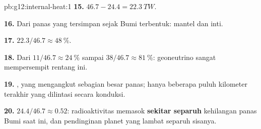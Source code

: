 \begin{solution}{pb:g12:internal-heat:1}
\textbf{15.} $46.7 - 24.4 = \qty{22.3}{TW}$.

\textbf{16.} Dari panas yang tersimpan sejak Bumi terbentuk: 
mantel dan inti.

\textbf{17.} $22.3/46.7 \approx \qty{48}{\percent}$.

\textbf{18.} Dari $11/46.7 \approx \qty{24}{\percent}$ sampai $38/46.7 \approx
\qty{81}{\percent}$: geoneutrino sangat mempersempit rentang ini.

\textbf{19.} , yang mengangkut sebagian besar panas; hanya
beberapa puluh kilometer terakhir yang dilintasi secara konduksi.

\textbf{20.} $24.4/46.7 \approx 0.52$: radioaktivitas memasok
\textbf{sekitar separuh} kehilangan panas Bumi saat ini, dan pendinginan
planet yang lambat separuh sisanya.
\end{solution}
